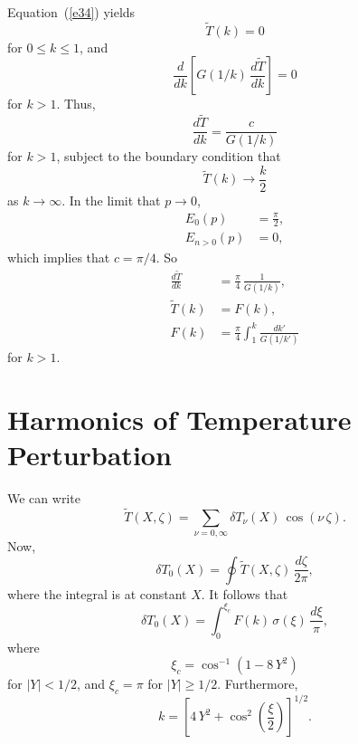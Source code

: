 \documentclass[12pt,prb,aps,notitlepage]{revtex4-1}
\begin{document}
Equation~(\ref{e34}) yields
\begin{equation}
\tilde{T}(k) = 0
\end{equation}
for $0\leq k\leq 1$, and 
\begin{equation}
\frac{d}{dk}\!\left[G(1/k)\,\frac{d\tilde{T}}{dk}\right]=0
\end{equation}
for $k>1$. Thus,
\begin{equation}
\frac{d\tilde{T}}{dk} = \frac{c}{G(1/k)}
\end{equation}
for $k>1$, subject to the boundary condition that
\begin{equation}
\tilde{T}(k)\rightarrow \frac{k}{2}
\end{equation}
as $k\rightarrow \infty$. In the limit that $p\rightarrow 0$, 
\begin{align}
E_0(p)&=\frac{\pi}{2},\\[0.5ex]
E_{n>0}(p) &= 0,
\end{align}
which implies that $c=\pi/4$. So
\begin{align}
\frac{d\tilde{T}}{dk} &= \frac{\pi}{4}\,\frac{1}{G(1/k)},\\[0.5ex]
\tilde{T}(k) &= F(k),\\[0.5ex]
F(k) &= \frac{\pi}{4}\int_1^k\frac{dk'}{G(1/k')}
\end{align}
for $k>1$. 

\section{Harmonics of Temperature Perturbation}
We can write
\begin{equation}
\tilde{T}(X,\zeta)=\sum_{\nu=0,\infty}\delta T_\nu(X)\,\cos(\nu\,\zeta).
\end{equation}
Now,
\begin{equation}
\delta T_0(X) = \oint \tilde{T}(X,\zeta)\,\frac{d\zeta}{2\pi},
\end{equation}
where the integral is at constant $X$. It follows that
\begin{equation}
\delta T_0(X) = \int_0^{\xi_c}F(k)\,\sigma(\xi)\,\frac{d\xi}{\pi},
\end{equation}
where 
\begin{equation}
\xi_c = \cos^{-1}(1-8\,Y^2)
\end{equation}
for $|Y|<1/2$, and $\xi_c=\pi$ for $|Y|\geq 1/2$. Furthermore,
\begin{equation}
k =\left[4\,Y^2 +\cos^2\left(\frac{\xi}{2}\right)\right]^{1/2}.
\end{equation}
\end{document}
